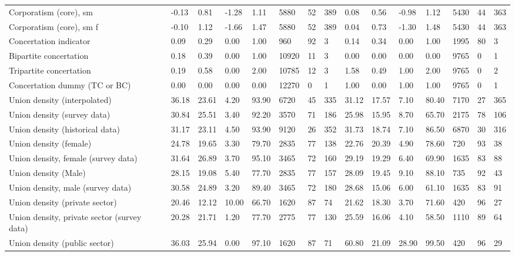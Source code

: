 \begin{longtable}{lllllllllllllll}
\addlinespace
Corporatism (core), sm & -0.13 & 0.81 & -1.28 & 1.11 & 5880 & 52 & 389 & 0.08 & 0.56 & -0.98 & 1.12 & 5430 & 44 & 363\\
Corporatism (core), sm f & -0.10 & 1.12 & -1.66 & 1.47 & 5880 & 52 & 389 & 0.04 & 0.73 & -1.30 & 1.48 & 5430 & 44 & 363\\
Concertation indicator & 0.09 & 0.29 & 0.00 & 1.00 & 960 & 92 & 3 & 0.14 & 0.34 & 0.00 & 1.00 & 1995 & 80 & 3\\
Bipartite concertation & 0.18 & 0.39 & 0.00 & 1.00 & 10920 & 11 & 3 & 0.00 & 0.00 & 0.00 & 0.00 & 9765 & 0 & 1\\
Tripartite concertation & 0.19 & 0.58 & 0.00 & 2.00 & 10785 & 12 & 3 & 1.58 & 0.49 & 1.00 & 2.00 & 9765 & 0 & 2\\
\addlinespace
Concertation dummy (TC or BC) & 0.00 & 0.00 & 0.00 & 0.00 & 12270 & 0 & 1 & 1.00 & 0.00 & 1.00 & 1.00 & 9765 & 0 & 1\\
Union density (interpolated) & 36.18 & 23.61 & 4.20 & 93.90 & 6720 & 45 & 335 & 31.12 & 17.57 & 7.10 & 80.40 & 7170 & 27 & 365\\
Union density (survey data) & 30.84 & 25.51 & 3.40 & 92.20 & 3570 & 71 & 186 & 25.98 & 15.95 & 8.70 & 65.70 & 2175 & 78 & 106\\
Union density (historical data) & 31.17 & 23.11 & 4.50 & 93.90 & 9120 & 26 & 352 & 31.73 & 18.74 & 7.10 & 86.50 & 6870 & 30 & 316\\
Union density (female) & 24.78 & 19.65 & 3.30 & 79.70 & 2835 & 77 & 138 & 22.76 & 20.39 & 4.90 & 78.60 & 720 & 93 & 38\\
\addlinespace
Union density, female (survey data) & 31.64 & 26.89 & 3.70 & 95.10 & 3465 & 72 & 160 & 29.19 & 19.29 & 6.40 & 69.90 & 1635 & 83 & 88\\
Union density (Male) & 28.15 & 19.08 & 5.40 & 77.70 & 2835 & 77 & 157 & 28.09 & 19.45 & 9.10 & 88.10 & 735 & 92 & 43\\
Union density, male (survey data) & 30.58 & 24.89 & 3.20 & 89.40 & 3465 & 72 & 180 & 28.68 & 15.06 & 6.00 & 61.10 & 1635 & 83 & 91\\
Union density (private sector) & 20.46 & 12.12 & 10.00 & 66.70 & 1620 & 87 & 74 & 21.62 & 18.30 & 3.70 & 71.60 & 420 & 96 & 27\\
Union density, private sector (survey data) & 20.28 & 21.71 & 1.20 & 77.70 & 2775 & 77 & 130 & 25.59 & 16.06 & 4.10 & 58.50 & 1110 & 89 & 64\\
\addlinespace
Union density (public sector) & 36.03 & 25.94 & 0.00 & 97.10 & 1620 & 87 & 71 & 60.80 & 21.09 & 28.90 & 99.50 & 420 & 96 & 29\\

\end{longtable}

